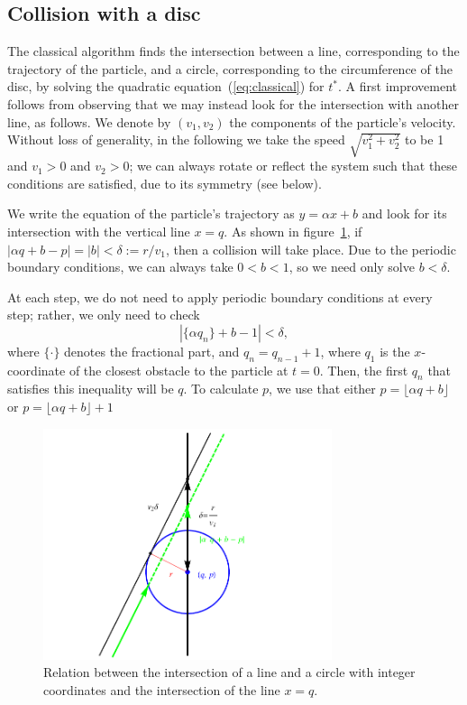 \documentclass{iopart}
\newcommand{\eqref}[1]{(\ref{#1})}
\begin{document}
\subsection{Collision with a disc}
The classical algorithm finds the intersection between a line, corresponding to the trajectory of 
the particle, and a circle, corresponding to the circumference of the disc, by solving the quadratic equation~\eqref{eq:classical} for $t^{\ast}$. A first improvement follows from observing that we may instead look for the intersection with another line, as follows. We denote by $(v_{1}, v_{2})$ the components of the particle's velocity. Without loss of generality, in the following we take the speed $\sqrt{v_{1}^{2} + v_{2}^{2}}$ to be 1 and $v_1>0$ and $v_2>0$; we can always rotate or reflect the system such that these conditions are satisfied, due to its symmetry (see below).

We write the equation of the particle's trajectory as $y=\alpha x+b$ and look for its intersection with the vertical line $x=q$. As shown in figure~\ref{fig:circle}, if $|\alpha q+b-p| = |b| < \delta := r/v_1$, then a collision will take place. Due to the periodic boundary conditions, we can always take $0 < b < 1$, so we need only solve $b<\delta$. 

At each step, we do not need to apply periodic boundary conditions at every step; rather, we only need to check 
\begin{equation}
|\{ \alpha  q_n \}+b -1|< \delta, 
\label{eq:master}
\end{equation}
where $\{ \cdot \}$ denotes the fractional part, and $q_n=q_{n-1}+1$, where $q_1$ is the $x$-coordinate of the closest obstacle to the particle at $t=0$. Then, the first $q_n$ that satisfies this inequality will be $q$. To calculate $p$, we use that either $p=\lfloor \alpha q +b\rfloor$ or $p=\lfloor \alpha q +b\rfloor+1$

\begin{figure}
\centering
\includegraphics [width=240pt]{fig01.pdf}
\caption{Relation between the intersection of a line and a circle with integer coordinates and the intersection of the line $x = q$. }
\label{fig:circle}
\end{figure}
\end{document}
